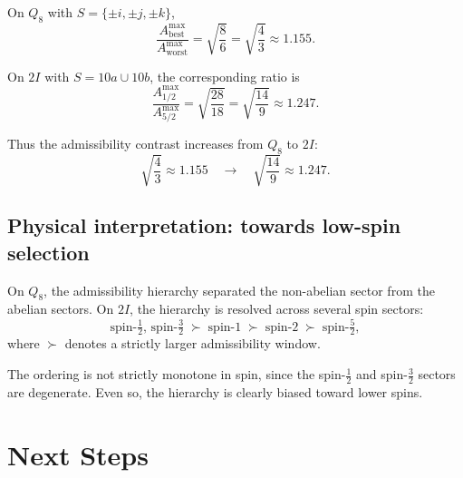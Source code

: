 \documentclass[11pt,a4paper]{article}
\begin{document}
    On $Q_8$ with $S=\{\pm i,\pm j,\pm k\}$,
    \begin{equation}
      \frac{A^{\max}_{\mathrm{best}}}{A^{\max}_{\mathrm{worst}}}
      = \sqrt{\frac{8}{6}}
      = \sqrt{\frac{4}{3}}
      \approx 1.155.
      \label{eq:Q8-ratio}
    \end{equation}

    On $2I$ with $S = 10a \cup 10b$, the corresponding ratio is
    \begin{equation}
      \frac{A^{\max}_{1/2}}{A^{\max}_{5/2}}
      = \sqrt{\frac{28}{18}}
      = \sqrt{\frac{14}{9}}
      \approx 1.247.
      \label{eq:2I-ratio}
    \end{equation}

    Thus the admissibility contrast increases from $Q_8$ to $2I$:
    \begin{equation}
      \sqrt{\frac{4}{3}}
      \approx 1.155
      \quad\longrightarrow\quad
      \sqrt{\frac{14}{9}}
      \approx 1.247.
      \label{eq:growing-hierarchy}
    \end{equation}

  \subsection{Physical interpretation: towards low-spin selection}
    \label{sec:step5-physics}

    On $Q_8$, the admissibility hierarchy separated the non-abelian sector from
    the abelian sectors.
    On $2I$, the hierarchy is resolved across several spin sectors:
    \begin{equation}
      \text{spin-}\tfrac{1}{2},\,\text{spin-}\tfrac{3}{2}
      \;\succ\;
      \text{spin-}1
      \;\succ\;
      \text{spin-}2
      \;\succ\;
      \text{spin-}\tfrac{5}{2},
      \label{eq:spin-ladder}
    \end{equation}
    where $\succ$ denotes a strictly larger admissibility window.

    The ordering is not strictly monotone in spin, since the
    spin-$\tfrac{1}{2}$ and spin-$\tfrac{3}{2}$ sectors are degenerate.
    Even so, the hierarchy is clearly biased toward lower spins.

  \section{Next Steps}
  \label{sec:next}
\end{document}
